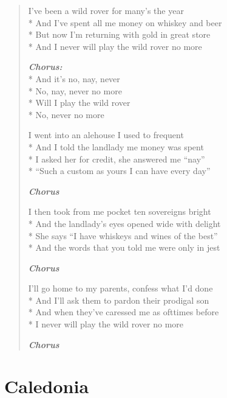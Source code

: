 \documentclass[9pt,twoside]{extarticle}
\newenvironment{xverse}{
	\begin{verse}
	\fontsize{8.5}{10.5}\selectfont
	}
	{
	\end{verse}
	\penalty 0
}
\newcommand{\chorusdef}{\textbf{\emph{Chorus:}}\\*}
\newcommand{\chorusmark}[1][1]{%
\vspace{-0.5\stanzaskip}%
\textbf{\emph{Chorus \ifthenelse{\equal{#1}{1}}{}{$\times$ #1}}}%
\vspace{-0.5\stanzaskip}%
}
\begin{document}
\begin{xverse}
I’ve been a wild rover for many’s the year \\*
And I’ve spent all me money on whiskey and beer \\*
But now I’m returning with gold in great store \\*
And I never will play the wild rover no more

\chorusdef
And it’s no, nay, never \\*
No, nay, never no more \\*
Will I play the wild rover \\*
No, never no more

I went into an alehouse I used to frequent \\*
And I told the landlady me money was spent \\*
I asked her for credit, she answered me “nay” \\*
“Such a custom as yours I can have every day”

\chorusmark

I then took from me pocket ten sovereigns bright \\*
And the landlady’s eyes opened wide with delight \\*
She says “I have whiskeys and wines of the best” \\*
And the words that you told me were only in jest

\chorusmark

I’ll go home to my parents, confess what I’d done \\*
And I’ll ask them to pardon their prodigal son \\*
And when they’ve caressed me as ofttimes before \\*
I never will play the wild rover no more

\chorusmark[2]
\end{xverse}

\section{Caledonia}
\end{document}
